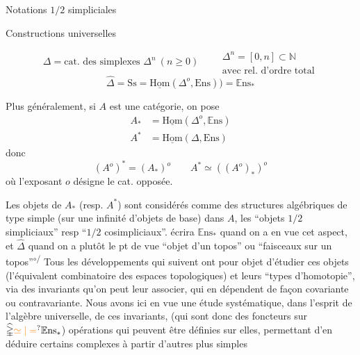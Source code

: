 Notations $1/2$ simpliciales

Constructions universelles

\[
 \mathbb{\Delta}=\text{cat. des simplexes }\Delta^n\ (n\geq0)
 \qquad\substack{\Delta^n=[0,n]\subset\mathbb{N}\\\text{avec rel. d'ordre total}}
\]
\[
 \widehat{\mathbb{\Delta}}=\mathrm{Ss}
 =\underline{\mathrm{Hom}}(\mathbb{\Delta}^o,\mathrm{E}\mathrm{ns}))
 =\mathbb{E}\mathrm{ns}_*
\]

Plus généralement, si $A$ est une catégorie, on pose
\[
 \begin{aligned}
 A_*&=\underline{\mathrm{Hom}}(\mathbb{\Delta}^o,\mathbb{E}\mathrm{ns})\\
 A^*&=\underline{\mathrm{Hom}}(\mathbb{\Delta},\mathrm{Ens})
 \end{aligned}
\]
donc
\[
 (A^o)^*=(A_*)^o\qquad A^*\simeq((A^o)_*)^o
\]
où l'exposant $o$ désigne le  cat. opposée.

Les objets de $A_*$ (resp. $A^*$) sont considérés comme des structures algébriques de type simple (sur une infinité d'objets de base) dans $A$, les ``objets $1/2$ simpliciaux'' resp ``$1/2$ cosimpliciaux''.  écrira $\mathbb{E}\mathrm{ns}_*$ quand on a en vue cet aspect, et $\widehat{\mathbb{\Delta}}$  quand on a plutôt le pt de vue ``objet d'un topos'' ou ``faisceaux sur un topos''\deleted{\unsure{,}}\textsuperscript{$\circ\!/$}%
Tous les développements qui suivent ont pour objet d'étudier ces objets (l'équivalent combinatoire des espaces topologiques) et leurs ``types d'homotopie'', via des invariants qu'on peut leur associer, qui en dépendent de façon covariante ou contravariante. Nous avons ici en vue une étude systématique, dans l'esprit de l'algèbre universelle, de ces invariants, (qui sont donc des foncteurs sur $\widehat{\mathbb{\Delta}}\unsure{\simeq|=}\mathbb{E}\mathrm{ns}_*$)   opérations qui peuvent être définies sur elles, permettant d'en déduire certains complexes \unsure{:} à partir d'autres plus simples

